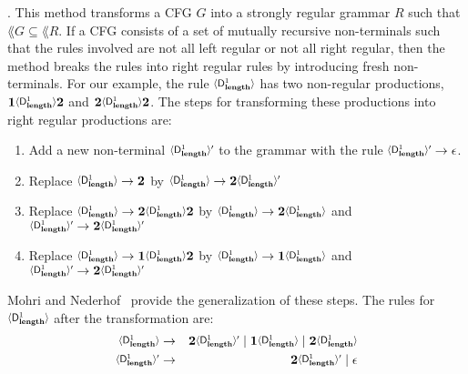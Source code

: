 .   This   method
transforms a CFG $G$ into a strongly  regular grammar $R$ such that $\lang{G} \subseteq \lang{R}$. 
If a CFG consists of a set of mutually recursive non-terminals such that the rules involved are not all left regular or not all right regular, then the method breaks the rules into right regular rules by introducing fresh non-terminals. For our example, the rule  $\var{\Df{\length}{1}}$ has two non-regular productions,           $\acdr\var{\Df{\length}{1}}\clazy$          and
$\clazy\var{\Df{\length}{1}}{\clazy}$.  The steps for transforming these productions into
right regular productions are:

\begin{enumerate}
\item
Add a  new non-terminal  $\varnew{\Df{\length}{1}}$ to the  grammar with
the rule $\varnew{\Df{\length}{1}} \rightarrow \epsilon$.
\item
 Replace     $\var{\Df{\length}{1}}     \rightarrow     \clazy$     by
 $\var{\Df{\length}{1}} \rightarrow \clazy\varnew{\Df{\length}{1}}$
\item
 Replace
 $\var{\Df{\length}{1}} \rightarrow \clazy\var{\Df{\length}{1}}\clazy$
 by  $\var{\Df{\length}{1}}  \rightarrow  \clazy\var{\Df{\length}{1}}$
 and \linebreak $\varnew{\Df{\length}{1}} \rightarrow \clazy\varnew{\Df{\length}{1}}$
\item
  Replace
 $\var{\Df{\length}{1}} \rightarrow \acdr\var{\Df{\length}{1}}\clazy$
 by $\var{\Df{\length}{1}} \rightarrow \acdr\var{\Df{\length}{1}}$ and
 \linebreak $\varnew{\Df{\length}{1}} \rightarrow \clazy\varnew{\Df{\length}{1}}$
\end{enumerate}

Mohri and Nederhof~\cite{mohri00regular} provide the generalization of
these  steps.  The  rules for  
$\var{\Df{\length}{1}}$ after the transformation are:
\begin{eqnarray*}              
  \var{\Df{\length}{1}}   &\rightarrow&   \clazy\varnew{\Df{\length}{1}}
  \mid                 \acdr\var{\Df{\length}{1}}                 \mid
  \clazy\var{\Df{\length}{1}}\\  \varnew{\Df{\length}{1}}  &\rightarrow&
  \clazy\varnew{\Df{\length}{1}} \mid \epsilon
\end{eqnarray*}



